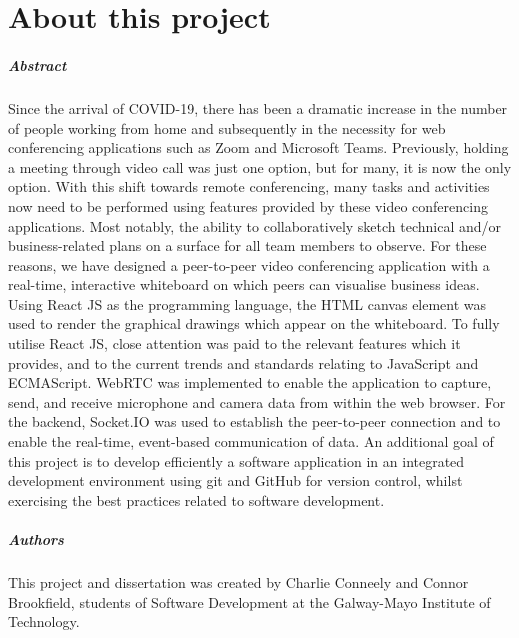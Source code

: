 
\chapter*{About this project}
\paragraph{Abstract}
Since the arrival of COVID-19, there has been a dramatic increase in the number of people working from home and subsequently in the necessity for web conferencing applications such as Zoom and Microsoft Teams. Previously, holding a meeting through video call was just one option, but for many, it is now the only option. With this shift towards remote conferencing, many tasks and activities now need to be performed using features provided by these video conferencing applications. Most notably, the ability to collaboratively sketch technical and/or business-related plans on a surface for all team members to observe. For these reasons, we have designed a peer-to-peer video conferencing application with a real-time, interactive whiteboard on which peers can visualise business ideas. Using React JS as the programming language, the HTML canvas element was used to render the graphical drawings which appear on the whiteboard. To fully utilise React JS, close attention was paid to the relevant features which it provides, and to the current trends and standards relating to JavaScript and ECMAScript. WebRTC was implemented to enable the application to capture, send, and receive microphone and camera data from within the web browser. For the backend, Socket.IO was used to establish the peer-to-peer connection and to enable the real-time, event-based communication of data. An additional goal of this project is to develop efficiently a software application in an integrated development environment using git and GitHub for version control, whilst exercising the best practices related to software development. 

\paragraph{Authors}
This project and dissertation was created by Charlie Conneely and Connor Brookfield, students of Software Development at the Galway-Mayo Institute of Technology.

